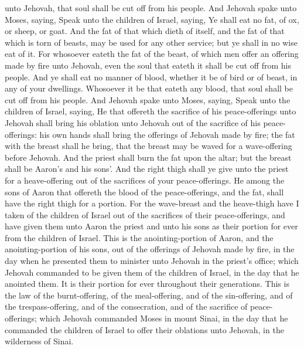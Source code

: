 unto Jehovah, that soul shall be cut off from his people.  And Jehovah spake unto Moses, saying, Speak unto the children of Israel, saying, Ye shall eat no fat, of ox, or sheep, or goat. And the fat of that which dieth of itself, and the fat of that which is torn of beasts, may be used for any other service; but ye shall in no wise eat of it. For whosoever eateth the fat of the beast, of which men offer an offering made by fire unto Jehovah, even the soul that eateth it shall be cut off from his people. And ye shall eat no manner of blood, whether it be of bird or of beast, in any of your dwellings. Whosoever it be that eateth any blood, that soul shall be cut off from his people.  And Jehovah spake unto Moses, saying, Speak unto the children of Israel, saying, He that offereth the sacrifice of his peace-offerings unto Jehovah shall bring his oblation unto Jehovah out of the sacrifice of his peace-offerings: his own hands shall bring the offerings of Jehovah made by fire; the fat with the breast shall he bring, that the breast may be waved for a wave-offering before Jehovah. And the priest shall burn the fat upon the altar; but the breast shall be Aaron’s and his sons’. And the right thigh shall ye give unto the priest for a heave-offering out of the sacrifices of your peace-offerings. He among the sons of Aaron that offereth the blood of the peace-offerings, and the fat, shall have the right thigh for a portion. For the wave-breast and the heave-thigh have I taken of the children of Israel out of the sacrifices of their peace-offerings, and have given them unto Aaron the priest and unto his sons as their portion for ever from the children of Israel.  This is the anointing-portion of Aaron, and the anointing-portion of his sons, out of the offerings of Jehovah made by fire, in the day when he presented them to minister unto Jehovah in the priest’s office; which Jehovah commanded to be given them of the children of Israel, in the day that he anointed them. It is their portion for ever throughout their generations.  This is the law of the burnt-offering, of the meal-offering, and of the sin-offering, and of the trespass-offering, and of the consecration, and of the sacrifice of peace-offerings; which Jehovah commanded Moses in mount Sinai, in the day that he commanded the children of Israel to offer their oblations unto Jehovah, in the wilderness of Sinai. 

